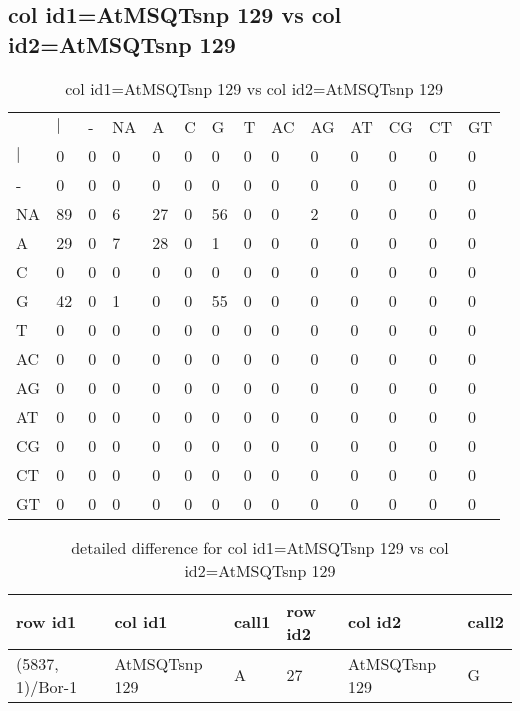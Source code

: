 \subsection{col id1=AtMSQTsnp 129 vs col id2=AtMSQTsnp 129}
\begin{center}
\begin{longtable}{|l|l|l|l|l|l|l|l|l|l|l|l|l|l|}
\caption{col id1=AtMSQTsnp 129 vs col id2=AtMSQTsnp 129} \label{table_dm712}\\
\hline
\\
\hline
&$|$&-&NA&A&C&G&T&AC&AG&AT&CG&CT&GT\\
$|$&0&0&0&0&0&0&0&0&0&0&0&0&0\\
-&0&0&0&0&0&0&0&0&0&0&0&0&0\\
NA&89&0&6&27&0&56&0&0&2&0&0&0&0\\
A&29&0&7&28&0&1&0&0&0&0&0&0&0\\
C&0&0&0&0&0&0&0&0&0&0&0&0&0\\
G&42&0&1&0&0&55&0&0&0&0&0&0&0\\
T&0&0&0&0&0&0&0&0&0&0&0&0&0\\
AC&0&0&0&0&0&0&0&0&0&0&0&0&0\\
AG&0&0&0&0&0&0&0&0&0&0&0&0&0\\
AT&0&0&0&0&0&0&0&0&0&0&0&0&0\\
CG&0&0&0&0&0&0&0&0&0&0&0&0&0\\
CT&0&0&0&0&0&0&0&0&0&0&0&0&0\\
GT&0&0&0&0&0&0&0&0&0&0&0&0&0\\
\hline
\end{longtable}
\end{center}

\begin{center}
\begin{longtable}{|l|l|l|l|l|l|}
\caption{detailed difference for col id1=AtMSQTsnp 129 vs col id2=AtMSQTsnp 129} \label{table_dm713}\\
\hline
row id1&col id1&call1&row id2&col id2&call2\\
\hline
(5837, 1)/Bor-1&AtMSQTsnp 129&A&27&AtMSQTsnp 129&G\\
\hline
\end{longtable}
\end{center}

